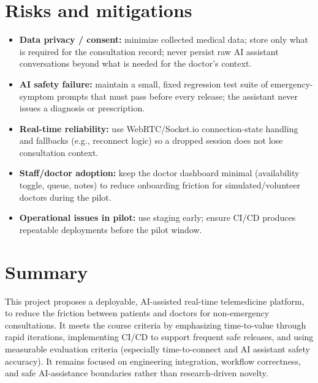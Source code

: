 \documentclass[11pt,a4paper]{article}
\begin{document}
\section{Risks and mitigations}
\begin{itemize}[leftmargin=0.7cm]
\item \textbf{Data privacy / consent:} minimize collected medical data; store only what is required for the consultation record; never persist raw AI assistant conversations beyond what is needed for the doctor's context.
\item \textbf{AI safety failure:} maintain a small, fixed regression test suite of emergency-symptom prompts that must pass before every release; the assistant never issues a diagnosis or prescription.
\item \textbf{Real-time reliability:} use WebRTC/Socket.io connection-state handling and fallbacks (e.g., reconnect logic) so a dropped session does not lose consultation context.
\item \textbf{Staff/doctor adoption:} keep the doctor dashboard minimal (availability toggle, queue, notes) to reduce onboarding friction for simulated/volunteer doctors during the pilot.
\item \textbf{Operational issues in pilot:} use staging early; ensure CI/CD produces repeatable deployments before the pilot window.
\end{itemize}
\section{Summary}
This project proposes a deployable, AI-assisted
real-time telemedicine platform, to
reduce the friction between patients and doctors for
non-emergency consultations. It meets the course
criteria by emphasizing time-to-value through rapid
iterations, implementing CI/CD to
support frequent safe releases, and using measurable
evaluation criteria (especially time-to-connect and AI
assistant safety accuracy). It remains focused on
engineering integration, workflow correctness, and safe
AI-assistance boundaries rather than research-driven
novelty.
\end{document}
